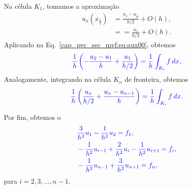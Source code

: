 Na célula $K_1$, tomamos a aproximação
\begin{subequations}
  \begin{align}
    u_x\left(x_{\frac{1}{2}}\right) &= \frac{u_{1} - u_{\frac{1}{2}}}{h/2} + O\left(h\right),\\
                                    &= = \frac{u_{1}}{h/2} + O\left(h\right).
  \end{align}
\end{subequations}
Aplicando na Eq.~\eqref{cap_pvc_sec_mvf:eq:aux00}, obtemos
\begin{equation}\color{blue}\frac{1}{h}\left(-\frac{u_{2}-u_{1}}{h} + \frac{u_1}{h/2}\right) = \frac{1}{h}\int_{K_i}f\,dx,
\end{equation}
Analogamente, integrando na célula $K_n$ de fronteira, obtemos
\begin{equation}\color{blue}\frac{1}{h}\left(\frac{u_{n}}{h/2} + \frac{u_{n} - u_{n-1}}{h}\right) = \frac{1}{h}\int_{K_i}f\,dx.
\end{equation}

Por fim, obtemos o 
\begin{subequations}\hleq
  \begin{align}
    &\frac{3}{h^2}u_1 - \frac{1}{h^2}u_{2} = f_1,\\
    &-\frac{1}{h^2}u_{i-1} + \frac{2}{h^2}u_i - \frac{1}{h^2}u_{i+1} = f_i,\\
    &-\frac{1}{h^2}u_{n-1} + \frac{3}{h^2}u_{n+1} = f_n,
  \end{align}
\end{subequations}
para $i = 2, 3, \dotsc, n-1$.

